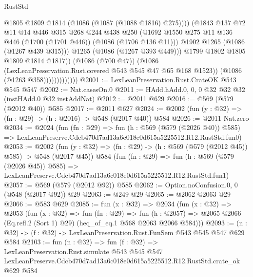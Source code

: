 \begin{lexlean}{RustStd}
\begin{coremodule}
                                    @1805
                                    @1809
                                    @1814
                                    (@1086 (@1087 (@1088 @1816) @275))))
                                (@1843
                                  @137
                                  @72
                                  @11
                                  @14
                                  @446
                                  @315
                                  @268
                                  @244
                                  @438
                                  @250
                                  (@1692
                                    @1550
                                    @275
                                    @11
                                    @136
                                    @446
                                    (@1700 (@1701 @446))
                                    (@1086 (@1706 @136 @11)))
                                  @1902
                                  @1265
                                  (@1086 (@1267 @439 @315)))
                                @1265
                                (@1086 (@1267 @393 @449)))
                              @1799
                              @1802
                              @1805
                              @1809
                              @1814
                              @1817))
                          (@1086 (@700 @47))
                          (@1086 (LexLeanPreservation.Rust.covered @543 @545 @47 @65 @168 @1523))
                          (@1086 (@1263 @358)))))))))))))
@2001 := LexLeanPreservation.Rust.CrateOK @543 @545 @547
@2002 := Nat.casesOn.{0}
@2011 := HAdd.hAdd.{0, 0, 0} @32 @32 @32 (instHAdd.{0} @32 instAddNat)
@2012 := @2011 @629
@2016 := @569 (@579 (@2012 @40)) @585
@2017 := @2011 @627
@2024 := @2002 (fun (y : @32) => (fn : @29) -> (h : @2016) -> @548 (@2017 @40)) @584
@2026 := @2011 Nat.zero
@2034 := @2024
    (fun (fn : @29) =>
    fun (h : @569 (@579 (@2026 @40)) @585) =>
    LexLeanPreserve.Cdcb470d7ad13a6c018e0d615a5225512.R12.RustStd.fun0)
@2053 := @2002
    (fun (y : @32) => (fn : @29) -> (h : @569 (@579 (@2012 @45)) @585) -> @548 (@2017 @45))
    @584
    (fun (fn : @29) =>
    fun (h : @569 (@579 (@2026 @45)) @585) =>
    LexLeanPreserve.Cdcb470d7ad13a6c018e0d615a5225512.R12.RustStd.fun1)
@2057 := @569 (@579 (@2012 @92)) @585
@2062 := Option.noConfusion.{0, 0} (@548 (@2017 @92)) @29
@2063 := @249 @29
@2065 := @2062 @2063 @29
@2066 := @583 @629
@2085 := fun (x : @32) =>
  @2034
    (fun (x : @32) =>
    @2053
      (fun (x : @32) =>
      fun (fn : @29) =>
      fun (h : @2057) =>
      @2065 @2066 (Eq.refl.{2} (Sort 1) @29) (heq_of_eq.{1} @568 @2063 @2066 @584)))
@2093 := (n : @32) -> (f : @32) -> LexLeanPreservation.Rust.FunSem @543 @545 @547 @629 @584
@2103 := fun (n : @32) =>
  fun (f : @32) =>
  LexLeanPreservation.Rust.simulate
    @543
    @545
    @547
    LexLeanPreserve.Cdcb470d7ad13a6c018e0d615a5225512.R12.RustStd.crate_ok
    @629
    @584
\end{coremodule}
\end{lexlean}
